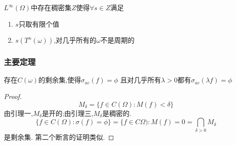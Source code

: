 \documentclass[compress,mathserif,red]{beamer}
\begin{document}
\begin{frame}
\begin{lemma}
$L^{\infty}(\Omega)$中存在稠密集$Z$使得$\forall s \in Z$满足
\begin{enumerate}
\item $s$只取有限个值
\item $s(T^n(\omega))$,对几乎所有的$\omega$不是周期的
\end{enumerate}

\end{lemma}
\end{frame}

\begin{frame}
\frametitle{主要定理}
\begin{theorem}
存在$C(\omega)$的剩余集,使得$\sigma_{ac}(f)=\phi$
且对几乎所有$\lambda>0$都有$\sigma_{ac}(\lambda f)=\phi$

\end{theorem}
\begin{proof}
$$M_\delta=\{ f \in C(\Omega):M(f)<\delta \}$$
由引理一,$M_\delta$是开的;由引理三,$M_\delta$是稠密的.
$$\{ f \in C(\Omega):\sigma(f)=\phi \}=\{ f \in C{\Omega):M(f)=0}=\bigcap_{\delta >0} M_\delta$$
是剩余集.
第二个断言的证明类似.
\end{proof}
\end{frame}
\end{document}
